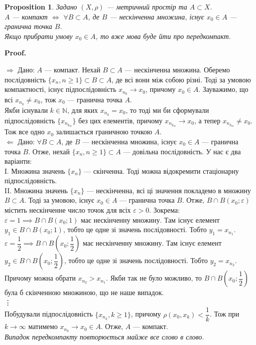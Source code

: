 \documentclass[a4paper, 10pt]{article}
\makeatletter
\def\rightproof{$\boxed{\Rightarrow}$ }
\def\leftproof{$\boxed{\Leftarrow}$ }
\theoremstyle{theoremdd}
\theoremstyle{theoremdd}
\theoremstyle{theoremdd}
\theoremstyle{theoremdd}
\theoremstyle{theoremdd}
\newtheorem{proposition}[theorem]{Proposition}
\theoremstyle{theoremdd}
\theoremstyle{theoremdd}
\theoremstyle{theoremdd}
\renewenvironment{proof}[1][Proof.\\]{\par
\pushQED{\hfill \qed}%
\normalfont \topsep6\p@\@plus6\p@\relax
\trivlist
\item\relax
{\bfseries
#1\@addpunct{.}}\hspace\labelsep\ignorespaces
}{%
\popQED\endtrivlist\@endpefalse
}
\makeatother
\begin{document}
\begin{proposition}
Задано $(X,\rho)$ --- метричний простір та $A \subset X$.\\
$A$ --- компакт $\iff $ $\forall B \subset A$, де $B$ --- нескінченна множина, існує $x_0 \in A$ --- гранична точка $B$.\\
Якщо прибрати умову $x_0 \in A$, то вже мова буде йти про передкомпакт.
\end{proposition}

\begin{proof}
\rightproof Дано: $A$ --- компакт. Нехай $B \subset A$ --- нескінченна множина. Оберемо послідовність $\{x_n, n \geq 1\} \subset B \subset A$, де всі вони між собою різні. Тоді за умовою компактності, існує підпослідовність $x_{n_k} \to x_0$, причому $x_0 \in A$. Зауважимо, що всі $x_{n_k} \neq x_0$, тож $x_0$ --- гранична точка $A$.\\
Якби існували $k \in \mathbb{N}$, для яких $x_{n_k} = x_0$, то тоді ми би сформували підпослідовність $\{x_{n_{k_m}}\}$ без цих елементів, причому $x_{n_{k_m}} \to x_0$, а тепер $x_{n_{k_m}} \neq x_0$. Тож все одно $x_0$ залишається граничною точкою $A$.
\bigskip \\
\leftproof Дано: $\forall B \subset A$, де $B$ --- нескінченна множина, існує $x_0 \in A$ --- гранична точка $B$. Отже, нехай $\{x_n, n \geq 1\} \subset A$ --- довільна послідовність. У нас є два варіанти:\\
I. Множина значень $\{x_n\}$ --- скінченна. Тоді можна відокремити стаціонарну підпослідовність.\\
II. Множина значень $\{x_n\}$ --- нескінченна, всі ці значення покладемо в множину $B \subset A$. Тоді за умовою, існує $x_0 \in A$ --- гранична точка $B$. Отже, $B \cap B(x_0;\varepsilon)$ містить нескінченне число точок для всіх $\varepsilon > 0$. Зокрема:\\
$\varepsilon = 1 \implies B \cap B(x_0;1)$ має нескінченну множину. Там існує елемент $y_1 \in B \cap B(x_0; 1)$, тобто це одне зі значень послідовності. Тобто $y_1 = x_{n_1}$.\\
$\varepsilon = \dfrac{1}{2} \implies B \cap B\left( x_0;\dfrac{1}{2} \right)$ має нескінченну множину. Там існує елемент $y_2 \in B \cap B\left( x_0;\dfrac{1}{2} \right)$, тобто це одне зі значень послідовності. Тобто $y_2 = x_{n_2}$. Причому можна обрати $x_{n_2} > x_{n_1}$. Якби так не було можливо, то $B \cap B\left(x_0; \dfrac{1}{2}\right)$ була б скінченною множиною, що не наше випадок.\\
\vdots \\
Побудували підпослідовність $\{x_{n_k}, k \geq 1\}$, причому $\rho(x_0,x_k) < \dfrac{1}{k}$. Тож при $k \to \infty$ матимемо $x_{n_k} \to x_0 \in A$. Отже, $A$ --- компакт.
\bigskip \\
\textit{Випадок передкомпакту повторюється майже все слово в слово.}
\end{proof}
\end{document}
